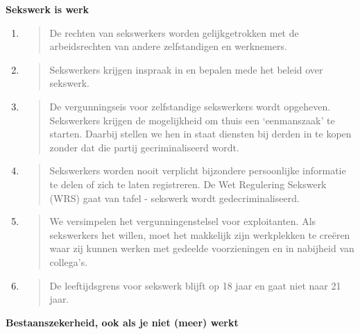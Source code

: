 \textbf{Sekswerk is werk}

\begin{enumerate}
\def\labelenumi{\arabic{enumi}.}
\item
  \begin{quote}
  De rechten van sekswerkers worden gelijkgetrokken met de
  arbeidsrechten van andere zelfstandigen en werknemers.
  \end{quote}
\item
  \begin{quote}
  Sekswerkers krijgen inspraak in en bepalen mede het beleid over
  sekswerk.
  \end{quote}
\item
  \begin{quote}
  De vergunningseis voor zelfstandige sekswerkers wordt opgeheven.
  Sekswerkers krijgen de mogelijkheid om thuis een `eenmanszaak' te
  starten. Daarbij stellen we hen in staat diensten bij derden in te
  kopen zonder dat die partij gecriminaliseerd wordt.
  \end{quote}
\item
  \begin{quote}
  Sekswerkers worden nooit verplicht bijzondere persoonlijke informatie
  te delen of zich te laten registreren. De Wet Regulering Sekswerk
  (WRS) gaat van tafel - sekswerk wordt gedecriminaliseerd.
  \end{quote}
\item
  \begin{quote}
  We versimpelen het vergunningenstelsel voor exploitanten. Als
  sekswerkers het willen, moet het makkelijk zijn werkplekken te creëren
  waar zij kunnen werken met gedeelde voorzieningen en in nabijheid van
  collega's.
  \end{quote}
\item
  \begin{quote}
  De leeftijdsgrens voor sekswerk blijft op 18 jaar en gaat niet naar 21
  jaar.
  \end{quote}
\end{enumerate}

\textbf{Bestaanszekerheid, ook als je niet (meer) werkt}

